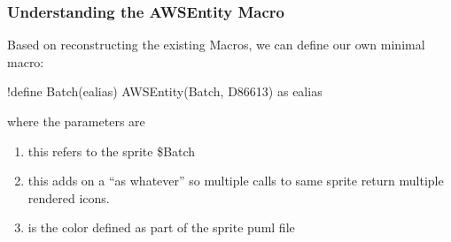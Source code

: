 \documentclass[letterpaper,10pt,english]{sphinxmanual}
\begin{document}
\subsubsection{Understanding the AWSEntity Macro}
\label{\detokenize{StdlibUnderTheHood/StdlibUnderstanding:understanding-the-awsentity-macro}}
Based on reconstructing the existing Macros, we can define our own
minimal macro:

\begin{sphinxVerbatim}[commandchars=\\\{\}]
!define Batch(e\PYGZus{}alias) AWSEntity(Batch, \PYGZsh{}D86613) as e\PYGZus{}alias
\end{sphinxVerbatim}

where the parameters are
\begin{enumerate}
%
\item {} 
 this refers to the sprite \$Batch

\item {} 
 this adds on a “as whatever” so multiple calls to same sprite return multiple rendered icons.

\item {} 
 is the color defined as part of the sprite puml file

\end{enumerate}

\begin{figure}[htbp]
\centering

\end{figure}
\end{document}
